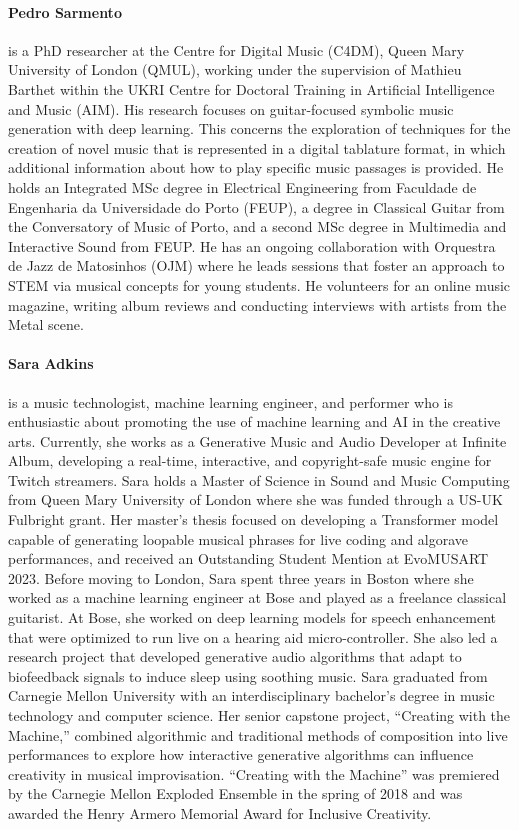 \paragraph{Pedro Sarmento} is a PhD researcher at the Centre for Digital Music (C4DM), Queen Mary University of London (QMUL), working under the supervision of Mathieu Barthet within the UKRI Centre for Doctoral Training in Artificial Intelligence and Music (AIM). His research focuses on guitar-focused symbolic music generation with deep learning. This concerns the exploration of techniques for the creation of novel music that is represented in a digital tablature format, in which additional information about how to play specific music passages is provided. He holds an Integrated MSc degree in Electrical Engineering from Faculdade de Engenharia da Universidade do Porto (FEUP), a degree in Classical Guitar from the Conversatory of Music of Porto, and a second MSc degree in Multimedia and Interactive Sound from FEUP. He has an ongoing collaboration with Orquestra de Jazz de Matosinhos (OJM) where he leads sessions that foster an approach to STEM via musical concepts for young students. He volunteers for an online music magazine, writing album reviews and conducting interviews with artists from the Metal scene.

\paragraph{Sara Adkins} is a music technologist, machine learning engineer, and performer who is enthusiastic about promoting the use of machine learning and AI in the creative arts. Currently, she works as a Generative Music and Audio Developer at Infinite Album, developing a real-time, interactive, and copyright-safe music engine for Twitch streamers. Sara holds a Master of Science in Sound and Music Computing from Queen Mary University of London where she was funded through a US-UK Fulbright grant. Her master's thesis focused on developing a Transformer model capable of generating loopable musical phrases for live coding and algorave performances, and received an Outstanding Student Mention at EvoMUSART 2023. Before moving to London, Sara spent three years in Boston where she worked as a machine learning engineer at Bose and played as a freelance classical guitarist. At Bose, she worked on deep learning models for speech enhancement that were optimized to run live on a hearing aid micro-controller. She also led a research project that developed generative audio algorithms that adapt to biofeedback signals to induce sleep using soothing music. Sara graduated from Carnegie Mellon University with an interdisciplinary bachelor's degree in music technology and computer science. Her senior capstone project, ``Creating with the Machine,'' combined algorithmic and traditional methods of composition into live performances to explore how interactive generative algorithms can influence creativity in musical improvisation. ``Creating with the Machine'' was premiered by the Carnegie Mellon Exploded Ensemble in the spring of 2018 and was awarded the Henry Armero Memorial Award for Inclusive Creativity.

